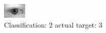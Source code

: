 \begin{figure}[h!]
\begin{center}
\includegraphics[width=0.60\columnwidth]{figures/ID622_class_2_target_3.png}
\end{center}
\caption{ Classification: 2 actual target: 3}
\label{fig:ID622_class_2_target_3}
\end{figure}
